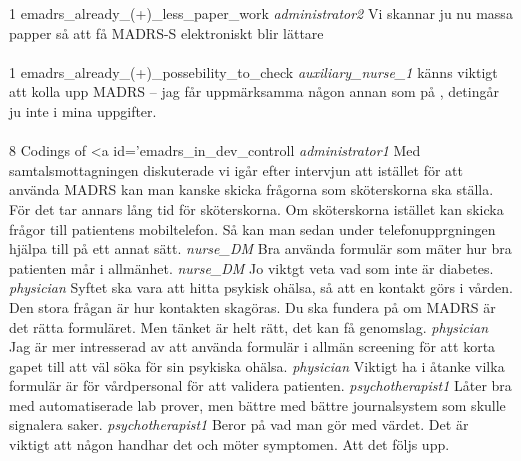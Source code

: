 \documentclass[12pt,a4paper,oneside]{article}
\begin{document}
1 
emadrs\_already\_(+)\_less\_paper\_work %
 {\it administrator2 %
 } 
Vi skannar ju nu massa papper så att få MADRS-S elektroniskt blir lättare %
\\
\\
1 
emadrs\_already\_(+)\_possebility\_to\_check %
 {\it auxiliary\_nurse\_1 %
 } 
 känns viktigt att kolla upp MADRS -- jag får uppmärksamma någon annan som på , detingår ju inte i mina uppgifter. %
\\
\\
8 Codings of <a id='emadrs\_in\_dev\_controll %
 {\it administrator1 %
 } 
Med samtalsmottagningen diskuterade vi igår efter intervjun att istället för att använda MADRS  kan man kanske skicka frågorna som sköterskorna ska ställa. För det tar annars lång tid för sköterskorna. Om sköterskorna istället kan skicka frågor till patientens mobiltelefon. Så kan man sedan under telefonupprgningen hjälpa till på ett annat sätt.  %
 {\it nurse\_DM %
 } 
Bra använda formulär som mäter hur bra patienten mår i allmänhet.  %
 {\it nurse\_DM %
 } 
Jo viktgt veta vad som inte är diabetes. %
 {\it physician %
 } 
 Syftet ska vara att hitta psykisk ohälsa, så att en kontakt görs i vården. Den stora frågan är hur kontakten skagöras. Du ska fundera på om MADRS är det rätta formuläret. Men tänket är helt rätt, det kan få genomslag.  %
 {\it physician %
 } 
Jag är mer intresserad av att använda formulär i allmän screening för att korta gapet till att väl söka för sin psykiska ohälsa.  %
 {\it physician %
 } 
Viktigt ha i åtanke vilka formulär är för vårdpersonal för att validera patienten. %
 {\it psychotherapist1 %
 } 
Låter bra med automatiserade lab prover, men bättre med bättre journalsystem som skulle signalera saker. %
 {\it psychotherapist1 %
 } 
Beror på vad man gör med värdet. Det är viktigt att någon handhar det och möter symptomen. Att det följs upp. %
\end{document}
